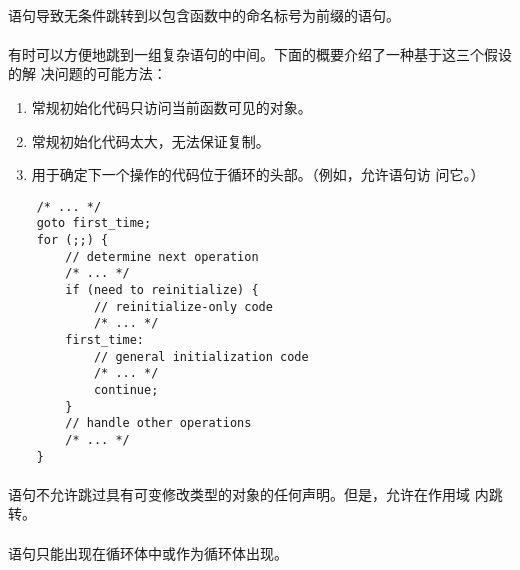 \semantic
\paragraph{}
语句导致无条件跳转到以包含函数中的命名标号为前缀的语句。

\paragraph{}
\ex 有时可以方便地跳到一组复杂语句的中间。下面的概要介绍了一种基于这三个假设的解
决问题的可能方法：
\begin{enumerate}
  \item{常规初始化代码只访问当前函数可见的对象。}
  \item{常规初始化代码太大，无法保证复制。}
  \item{用于确定下一个操作的代码位于循环的头部。（例如，允许语句访
    问它。）}
\end{enumerate}
\begin{lstlisting}
    /* ... */
    goto first_time;
    for (;;) {
        // determine next operation
        /* ... */
        if (need to reinitialize) {
            // reinitialize-only code
            /* ... */
        first_time:
            // general initialization code
            /* ... */
            continue;
        }
        // handle other operations
        /* ... */
    }
\end{lstlisting}

\paragraph{}
\ex {}语句不允许跳过具有可变修改类型的对象的任何声明。但是，允许在作用域
内跳转。

\constraint
\paragraph{}
语句只能出现在循环体中或作为循环体出现。

\semantic
